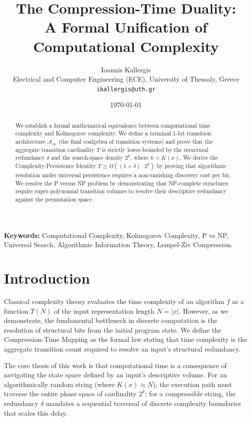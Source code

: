 \documentclass[12pt,a4paper]{article}
\title{The Compression-Time Duality:\\A Formal Unification of Computational Complexity}
\author{Ioannis Kallergis \\ \small Electrical and Computer Engineering (ECE), University of Thessaly, Greece \\ \small \texttt{ikallergis@uth.gr}}
\date{\today}
\theoremstyle{plain}
\theoremstyle{definition}
\begin{document}
\maketitle

\begin{abstract}
We establish a formal mathematical equivalence between computational time complexity and
Kolmogorov complexity. We define a terminal 1-bit transition architecture $\mathcal{A}_\infty$
(the final coalgebra of transition systems) and prove that the aggregate transition cardinality $T$
is strictly lower-bounded by the structural redundancy $\delta$ and the 
search-space density $2^{k}$, where $k=K(x)$. We derive the Complexity-Persistence 
Identity $T \ge \Omega((1+\delta) \cdot 2^{k})$ by proving that algorithmic resolution under 
universal persistence requires a non-vanishing discovery cost per bit. We resolve the P 
versus NP problem by demonstrating that NP-complete structures require super-polynomial 
transition volumes to resolve their descriptive redundancy against the permutation space.
\end{abstract}

\vspace{1em}
\textbf{Keywords:} Computational Complexity, Kolmogorov Complexity, P vs NP, Universal
Search, Algorithmic Information Theory, Lempel-Ziv Compression.

\clearpage

\section{Introduction}

Classical complexity theory evaluates the time complexity of an algorithm $f$ as a function
$T(N)$ of the input representation length $N=|x|$. However, as we demonstrate, the fundamental 
bottleneck in discrete computation is the resolution of structural bits from the initial 
program state. We define the Compression-Time Mapping as the formal law stating that time 
complexity is the aggregate transition count required to resolve an input's structural 
redundancy.

The core thesis of this work is that computational time is a consequence of navigating the 
state space defined by an input's descriptive volume. For an algorithmically random string 
(where $K(x) \approx N$), the execution path must traverse the entire phase space of 
cardinality $2^k$; for a compressible string, the redundancy $\delta$ mandates a sequential 
traversal of discrete complexity boundaries that scales this delay.
\end{document}

